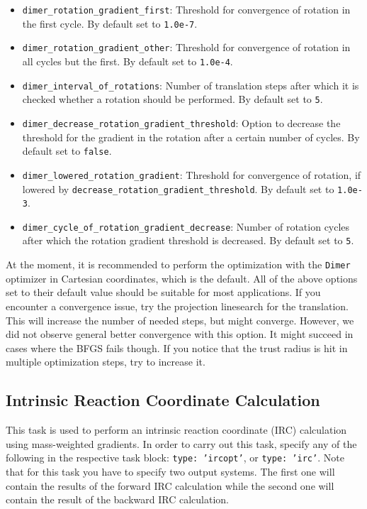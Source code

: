\documentclass[]{tufte-book}
\begin{document}
\begin{itemize}
\item \texttt{dimer\_rotation\_gradient\_first}: Threshold for convergence of rotation in the first cycle. By default set to \texttt{1.0e-7}.
\item \texttt{dimer\_rotation\_gradient\_other}: Threshold for convergence of rotation in all cycles but the first. By default set to \texttt{1.0e-4}.
\item \texttt{dimer\_interval\_of\_rotations}: Number of translation steps after which it is checked whether a rotation should be performed. By default set to \texttt{5}.
\item \texttt{dimer\_decrease\_rotation\_gradient\_threshold}: Option to decrease the threshold for the gradient in the rotation after a certain number of cycles. By default set to \texttt{false}.
\item \texttt{dimer\_lowered\_rotation\_gradient}: Threshold for convergence of rotation, if lowered by \texttt{decrease\_rotation\_gradient\_threshold}. By default set to \texttt{1.0e-3}.
\item \texttt{dimer\_cycle\_of\_rotation\_gradient\_decrease}: Number of rotation cycles after which the rotation gradient threshold is decreased. By default set to \texttt{5}.
\end{itemize}
At the moment, it is recommended to perform the optimization with the \texttt{Dimer} optimizer in Cartesian coordinates, which is the default. All of the above options set to their default value should be suitable for most applications. If you encounter a convergence issue, try the projection linesearch for the translation. This will increase the number of needed steps, but might converge. However, we did not observe general better convergence with this option. It might succeed in cases where the BFGS fails though. If you notice that the trust radius is hit in multiple optimization steps, try to increase it.

\subsection{Intrinsic Reaction Coordinate Calculation}

This task is used to perform an intrinsic reaction coordinate (IRC) calculation using mass-weighted gradients.
In order to carry out this task, specify any of the following in the respective task block: \texttt{type: 'ircopt'},
or \texttt{type: 'irc'}. Note that for this task you have to specify two output systems. The first one will contain
the results of the forward IRC calculation while the second one will contain the result of the backward IRC calculation.
\end{document}
